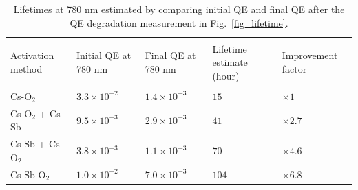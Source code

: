 \setlength{\tabcolsep}{4pt}	
\begin{table}
	\centering
	
	\begin{tabular}{l|llll}
		\hline \hline \\
		\multirow{2}{5em}{Activation method} & \multirow{2}{5em}{Initial QE at 780 nm}            & \multirow{2}{5em}{Final QE at 780 nm}               & %
		\multirow{2}{7em}{Lifetime estimate (hour)} & \multirow{2}{6em}{Improvement factor} \\
		 \\
		\hline
		\\Cs-O$_2$ & $3.3 \times 10^{-2}$              &    $1.4 \times 10^{-3}$           & %
		$15$    &$\times 1$                                                                \\
		Cs-O$_2$ + Cs-Sb			 & $9.5 \times 10^{-3}$ & $2.9 \times 10^{-3}$	& %
		$41$ &$\times 2.7$\\
		Cs-Sb + Cs-O$_2$    & $3.8 \times 10^{-3}$              & $1.1 \times 10^{-3}$      & %
		$70$        & $\times 4.6$                                                                   \\
	
		Cs-Sb-O$_2$				& $1.0 \times 10^{-2}$			& $7.0 \times 10^{-3}$	&%
		$104 $	&$ \times 6.8$	\\

		\hline \hline                                                                             
	\end{tabular}
	\caption{Lifetimes at 780 nm estimated by comparing initial QE and final QE after the QE degradation measurement in Fig.~\ref{fig_lifetime}.}
	\label{table2}
\end{table}


